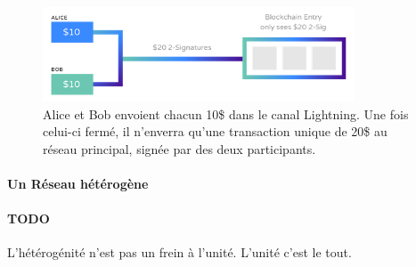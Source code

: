 \begin{figure}[h]
    \centering
    \includegraphics[width=350px]{chapters/02/images/lightning_network.png}
    \caption{\label{lightning_network} Alice et Bob envoient chacun 10\$ dans le canal Lightning. Une fois celui-ci fermé,
    il n'enverra qu'une transaction unique de 20\$ au réseau principal, signée par des deux participants.}
\end{figure}


\paragraph{Un Réseau hétérogène}

\paragraph{TODO} L'hétérogénité n'est pas un frein à l'unité. L'unité c'est le tout.
